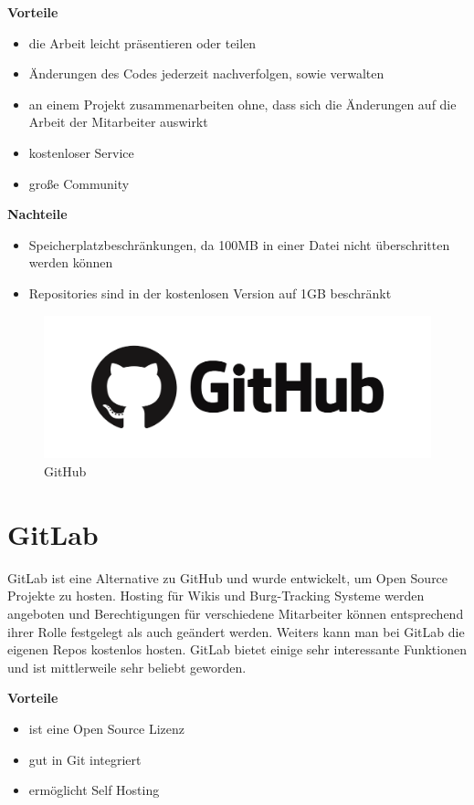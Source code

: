 \textbf{Vorteile}
\begin{itemize}
	\item die Arbeit leicht präsentieren oder teilen
	\item Änderungen des Codes jederzeit nachverfolgen, sowie verwalten
	\item an einem Projekt zusammenarbeiten ohne, dass sich die Änderungen auf die Arbeit der Mitarbeiter auswirkt
	\item kostenloser Service
	\item große Community
\end{itemize}

\textbf{Nachteile}
\begin{itemize}
	\item Speicherplatzbeschränkungen, da 100MB in einer Datei nicht überschritten werden können
	\item Repositories sind in der kostenlosen Version auf 1GB beschränkt
\end{itemize}


\begin{figure}[H]
	\centering
	\includegraphics[width=0.5\linewidth]{images/GitHub.png}
	\caption[GitHub]{GitHub}
	\label{fig:GitHub}
\end{figure}

\newpage
\section{GitLab}
GitLab ist eine Alternative zu GitHub und wurde entwickelt, um Open Source Projekte zu hosten. Hosting für Wikis und Burg-Tracking Systeme werden angeboten und Berechtigungen für verschiedene Mitarbeiter können entsprechend ihrer Rolle festgelegt als auch geändert werden. Weiters kann man bei GitLab die eigenen Repos kostenlos hosten. GitLab bietet einige sehr interessante Funktionen und ist mittlerweile sehr beliebt geworden.   \parencite{GitHubVsGitLab}

\textbf{Vorteile}
\begin{itemize}
	\item ist eine Open Source Lizenz
	\item gut in Git integriert
	\item ermöglicht Self Hosting
\end{itemize}

